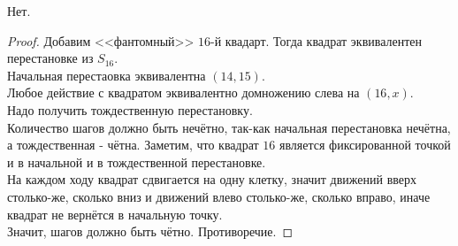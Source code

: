 \documentclass[11pt, oneside]{article}   	%
\begin{document}
    \begin{dlemma}
        Нет.\\
        \begin{proof}
            Добавим <<фантомный>> $16$-й квадарт. Тогда квадрат эквивалентен перестановке из $S_{16}$.\\
            Начальная перестаовка эквивалентна $\left( 14, 15 \right) $.\\
            Любое действие с квадратом эквивалентно домножению слева на $\left( 16, x \right) $.\\
            Надо получить тождественную перестановку.\\
            Количество шагов должно быть нечётно, так-как начальная перестановка нечётна, а тождественная - чётна.
            Заметим, что квадрат $16$ является фиксированной точкой и в начальной и в тождественной перестановке.\\
            На каждом ходу квадрат сдвигается на одну клетку, значит движений вверх столько-же, сколько вниз и движений влево столько-же, сколько вправо, иначе квадрат не вернётся в начальную точку.\\
            Значит, шагов должно быть чётно. Противоречие.
        \end{proof}
    \end{dlemma}
\end{document}
